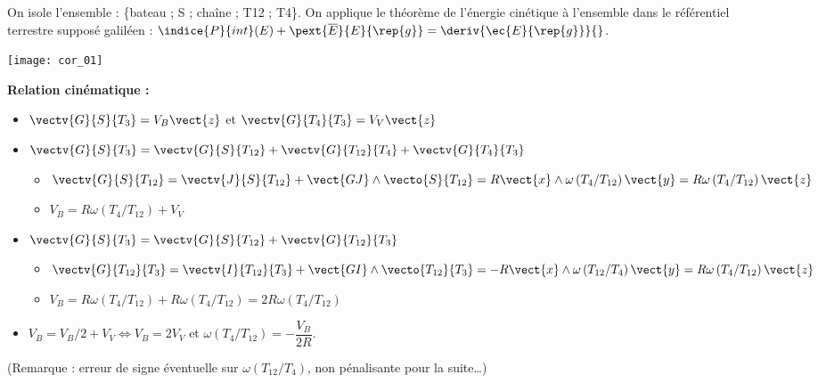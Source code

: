 \fi

\ifprof
\begin{corrige}
On isole l'ensemble : \{bateau ; S ; chaîne ; T12 ; T4\}. On applique le théorème de l'énergie cinétique à l’ensemble dans le référentiel terrestre supposé galiléen : 
$\indice{P}{int}(E)+ \pext{\overline{E}}{E}{\rep{g}} = \deriv{\ec{E}{\rep{g}}}{}$.

\begin{center}
\texttt{[image: cor\_01]}
\end{center} 


\textbf{Relation cinématique :}


\begin{itemize}
	\item $\vectv{G}{S}{T_3}=V_B \vect{z}$ et $\vectv{G}{T_4}{T_{3}}=V_V \vect{z}$
	\item $\vectv{G}{S}{T_3}=\vectv{G}{S}{T_{12}}+\vectv{G}{T_{12}}{T_{4}}+\vectv{G}{T_4}{T_{3}}$
	\begin{itemize}
	\item $\vectv{G}{S}{T_{12}}=\vectv{J}{S}{T_{12}}+\vect{GJ}\wedge\vecto{S}{T_{12}}=R\vect{x}\wedge \omega\left({T_{4}}/{T_{12}}\right) \vect{y}=R\omega\left({T_{4}}/{T_{12}}\right) \vect{z}$
	\item $V_B=R\omega\left({T_{4}}/{T_{12}}\right)+V_V$
	\end{itemize}
	\item $\vectv{G}{S}{T_3}=\vectv{G}{S}{T_{12}}+\vectv{G}{T_{12}}{T_{3}}$
	\begin{itemize}
	\item $\vectv{G}{T_{12}}{T_{3}}=\vectv{I}{T_{12}}{T_{3}}+\vect{GI}\wedge\vecto{T_{12}}{T_{3}}=-R\vect{x}\wedge \omega\left({T_{12}}/{T_{4}}\right)\vect{y}=R\omega\left({T_{4}}/{T_{12}}\right) \vect{z}$
	\item $V_B=R\omega\left({T_{4}}/{T_{12}}\right)+R\omega\left({T_{4}}/{T_{12}}\right)=2R\omega\left({T_{4}}/{T_{12}}\right)$
\end{itemize}
\item $V_B=V_B/2+V_V\Longleftrightarrow V_B=2V_V$ et $\omega\left({T_{4}}/{T_{12}}\right)=-\dfrac{V_B}{2R}$.	 
\end{itemize}

(Remarque : erreur de signe éventuelle sur $\omega\left({T_{12}}/{T_{4}}\right)$, non pénalisante pour la suite…)



\end{corrige}
